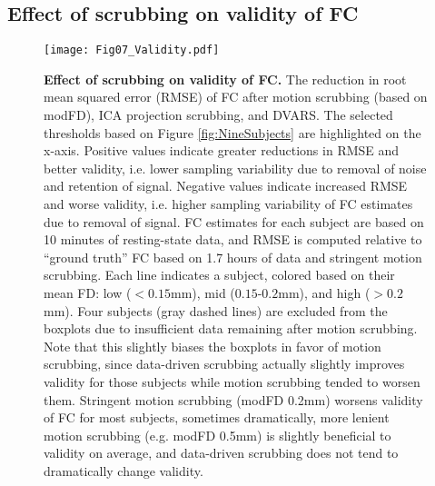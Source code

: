 \documentclass{article}
\begin{document}
\subsection{Effect of scrubbing on validity of FC}

\begin{figure}
    \centering
    \hspace{-1in}\texttt{[image: Fig07\_Validity.pdf]}
    \caption{\small \textbf{Effect of scrubbing on validity of FC.} The reduction in root mean squared error (RMSE) of FC after motion scrubbing (based on modFD), ICA projection scrubbing, and DVARS. The selected thresholds based on Figure \ref{fig:NineSubjects} are highlighted on the x-axis. Positive values indicate greater reductions in RMSE and better validity, i.e. lower sampling variability due to removal of noise and retention of signal. Negative values indicate increased RMSE and worse validity, i.e. higher sampling variability of FC estimates due to removal of signal. FC estimates for each subject are based on 10 minutes of resting-state data, and RMSE is computed relative to ``ground truth'' FC based on 1.7 hours of data and stringent motion scrubbing. Each line indicates a subject, colored based on their mean FD: low ($<0.15$mm), mid ($0.15$-$0.2$mm), and high ($>0.2$mm). Four subjects (gray dashed lines) are excluded from the boxplots due to insufficient data remaining after motion scrubbing. %
    Note that this slightly biases the boxplots in favor of motion scrubbing, since data-driven scrubbing actually slightly improves validity for those subjects while motion scrubbing tended to worsen them.
    Stringent motion scrubbing (modFD 0.2mm) worsens validity of FC for most subjects, sometimes dramatically, more lenient motion scrubbing (e.g. modFD 0.5mm) is slightly beneficial to validity on average, and data-driven scrubbing does not tend to dramatically change validity.}
    \label{fig:RMSE}
\end{figure}
\end{document}
